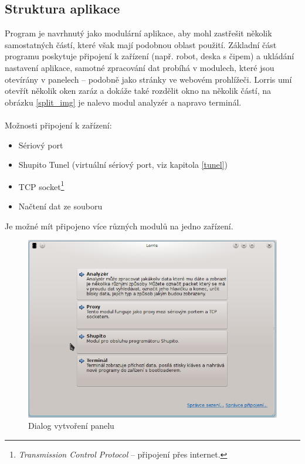 \documentclass[12pt, a4paper, oneside]{article}
\newcommand{\It}{\textit}  %
\begin{document}
\subsection{Struktura aplikace}
Program je navrhnutý jako modulární aplikace, aby mohl zastřešit několik samostatných částí, které však mají podobnou oblast použití. Základní část programu poskytuje připojení k zařízení (např. robot, deska s čipem) a ukládání nastavení aplikace, samotné zpracování dat probíhá v modulech, které jsou otevírány v panelech -- podobně jako stránky ve webovém prohlížeči. Lorris umí otevřít několik oken zaráz a dokáže také rozdělit okno na několik částí, na obrázku \ref{split_img} je nalevo modul analyzér a napravo terminál. \\
\\
\noindent Možnosti připojení k zařízení:
\begin{itemize}
    \item Sériový port
    \item Shupito Tunel (virtuální sériový port, viz kapitola \ref{tunel})
    \item TCP socket\footnote{\It{Transmission Control Protocol} -- připojení přes internet.}
    \item Načtení dat ze souboru
\end{itemize}
Je možné mít připojeno více různých modulů na jedno zařízení.  


\begin{figure}[H]
\begin{center}
\includegraphics[scale=0.6]{img/new_tab.png}
\caption{Dialog vytvoření panelu}
\end{center}
\end{figure}
\end{document}
